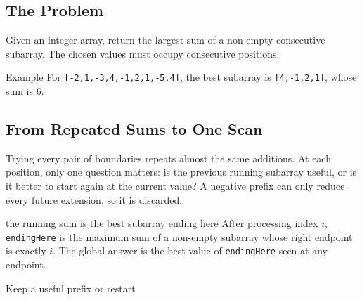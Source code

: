 

\subsection{The Problem}
Given an integer array, return the largest sum of a non-empty consecutive
subarray. The chosen values must occupy consecutive positions.

\begin{conceptbox}{Example}
For \texttt{[-2,1,-3,4,-1,2,1,-5,4]}, the best subarray is
\texttt{[4,-1,2,1]}, whose sum is \(6\).
\end{conceptbox}

\subsection{From Repeated Sums to One Scan}
Trying every pair of boundaries repeats almost the same additions. At each
position, only one question matters: is the previous running subarray useful,
or is it better to start again at the current value? A negative prefix can
only reduce every future extension, so it is discarded.

\begin{invariantbox}{the running sum is the best subarray ending here}
After processing index \(i\), \texttt{endingHere} is the maximum sum of a
non-empty subarray whose right endpoint is exactly \(i\). The global answer is
the best value of \texttt{endingHere} seen at any endpoint.
\end{invariantbox}

\begin{visualbox}{Keep a useful prefix or restart}
\centering
{}
\end{visualbox}

